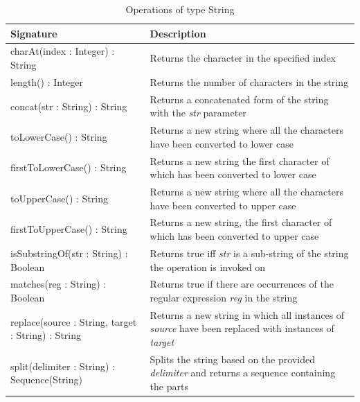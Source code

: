 \begin{longtable} {|p{5.5cm}|p{6.5cm}|}
			
			\caption{Operations of type String}
			\label{tab:StringOperations}\\
			
			\hline
							
			\textbf{Signature} & \textbf{Description} \\\hline
			
			charAt(index : Integer) : String & Returns the character in the specified index\\\hline
			
			length() : Integer & Returns the number of characters in the string \\\hline
			
			concat(str : String) : String & Returns a concatenated form of the string with the \emph{str} parameter\\\hline
			
			toLowerCase() : String & Returns a new string where all the characters have been converted to lower case\\\hline
			
			firstToLowerCase() : String & Returns a new string the first character of which has been converted to lower case \\\hline
			
			toUpperCase() : String & Returns a new string where all the characters have been converted to upper case\\\hline
			
			firstToUpperCase() : String & Returns a new string, the first character of which has been converted to upper case \\\hline
			
			isSubstringOf(str : String) : Boolean & Returns true iff \emph{str} is a sub-string of the string the operation is invoked on\\\hline
			
			matches(reg : String) : Boolean & Returns true if there are occurrences of the regular expression \emph{reg} in the string\\\hline
			
			replace(source : String, target : String) : String & Returns a new string in which all instances of \emph{source} have been replaced with instances of \emph{target}\\\hline 
			
			split(delimiter : String) : Sequence(String) & Splits the string based on the provided \emph{delimiter} and returns a sequence containing the parts\\\hline
			

\end{longtable}
